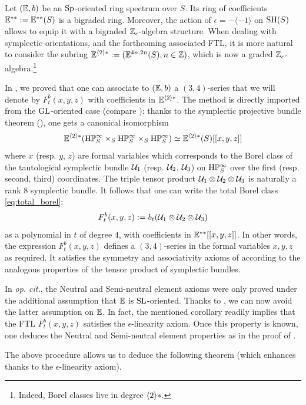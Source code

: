 \begin{num}\label{num:SP-orient->FTL}
Let $(\mathbb E,b)$ be an $\mathrm{Sp}$-oriented ring spectrum over $S$.
 Its ring of coefficients $\mathbb E^{**}:=\mathbb E^{**}(S)$ is a bigraded ring.
 Moreover, the action of $\epsilon=-\langle -1 \rangle$ on $\operatorname{SH}(S)$
 allows to equip it with a bigraded $\mathbb{Z}_\epsilon$-algebra structure.
 When dealing with symplectic orientations, and the forthcoming associated
 FTL, it is more natural to consider the subring
 $\mathbb E^{\langle 2 \rangle*}:=(\mathbb E^{4n,2n}(S), n \in \mathbb{Z})$,
 which is now a graded $\mathbb{Z}_\epsilon$-algebra.\footnote{Indeed, Borel classes live
 in degree $\langle 2 \rangle*$.}

In \cite[Def. 2.3.2]{DF3}, we proved that one can associate to $(\mathbb E,b)$
 a $(3,4)$-series that we will denote by $F_t^b(x,y,z)$
 with coefficients in $\mathbb E^{\langle 2 \rangle*}$.
 The method is directly imported from the $\mathrm{GL}$-oriented case
 (compare \cite[2.1.19]{Deg12}):
 thanks to the symplectic projective bundle theorem (\cite[2.2.3]{DF3}),
 one gets a canonical isomorphism
$$
\mathbb E^{\langle 2 \rangle*}(\mathrm{H}\mathbb P^\infty_S \times_S \mathrm{H}\mathbb P^\infty_S \times_S \mathrm{H}\mathbb P^\infty_S)
 \simeq \mathbb E^{\langle 2 \rangle*}(S)[[x,y,z]]
$$
where $x$ (resp. $y$, $z$) are formal variables which corresponds
 to the Borel class of the tautological symplectic bundle $\mathcal U_1$ (resp. $\mathcal U_2$, $\mathcal U_3$) on $\mathrm{H}\mathbb P^\infty_S$
  over the first (resp. second, third) coordinates.
 The triple tensor product $\mathcal U_1 \otimes \mathcal U_2 \otimes \mathcal U_3$ is naturally a rank $8$ symplectic bundle. 
 It follows that one can write the total Borel class \eqref{eq:total_borel}:
\begin{equation}\label{eq:Borel&FTL}
F_t^b(x,y,z):=b_t(\mathcal U_1 \otimes \mathcal U_2 \otimes \mathcal U_3)
\end{equation}
as a polynomial in $t$ of degree $4$, with coefficients in $\mathbb E^{**}[[x,y,z]]$.
 In other words, the expression $F_t^b(x,y,z)$
 defines a $(3,4)$-series in the formal variables $x,y,z$ as required.
 It satisfies the symmetry and associativity axioms of 
 according to the analogous properties of the tensor product
 of symplectic bundles.

In \emph{op. cit.}, the Neutral and Semi-neutral element axioms were only proved
 under the additional assumption that $\mathbb E$ is $\mathrm{SL}$-oriented.
 Thanks to , we can now avoid the latter assumption on $\mathbb E$.
 In fact, the mentioned corollary readily implies that the FTL $F_t^b(x,y,z)$
 satisfies the $\epsilon$-linearity axiom.
 Once this property is known, one deduces the Neutral and Semi-neutral element
 properties as in the proof of \cite[Prop. 2.3.4]{DF3}.

The above procedure allows us to deduce the following theorem
 (which enhances \cite[]{DF3} thanks to the $\epsilon$-linearity axiom).
\end{num}
